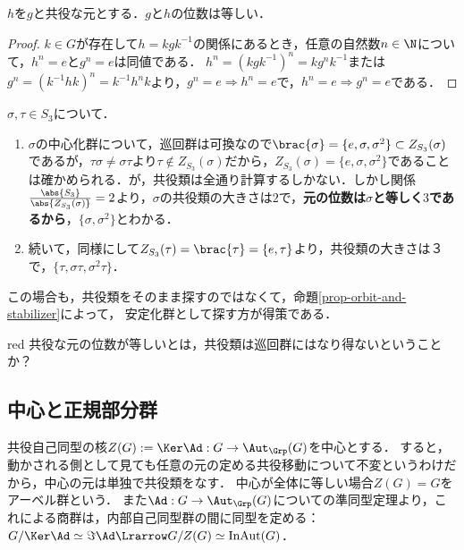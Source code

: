 \documentclass[uplatex,dvipdfmx]{jsreport}
\begin{document}
\begin{lemma}[共役の代数的本質]
    $h$を$g$と共役な元とする．$g$と$h$の位数は等しい．
\end{lemma}
\begin{proof}
    $k\in G$が存在して$h=kgk^{-1}$の関係にあるとき，任意の自然数$n\in\N$について，$h^n=e$と$g^n=e$は同値である．
    $h^n=(kgk^{-1})^n=kg^nk^{-1}$または$g^n=(k^{-1}hk)^n=k^{-1}h^nk$より，$g^n=e\Rightarrow h^n=e$で，$h^n=e\Rightarrow g^n=e$である．
\end{proof}

\begin{example}[$S_3$の類等式]\label{exp-class-equation-of-S3}
    $\sigma,\tau\in S_3$について．
    \begin{enumerate}
        \item $\sigma$の中心化群について，巡回群は可換なので$\brac{\sigma}=\{e,\sigma,\sigma^2\}\subset Z_{S_3}(\sigma)$であるが，$\tau\sigma\ne\sigma\tau$より$\tau\notin Z_{S_3}(\sigma)$だから，$Z_{S_3}(\sigma)=\{e,\sigma,\sigma^2\}$であることは確かめられる．が，共役類は全通り計算するしかない．しかし関係$\frac{\abs{S_3}}{\abs{Z_{S_3}(\sigma)}}=2$より，$\sigma$の共役類の大きさは$2$で，\textbf{元の位数は$\sigma$と等しく$3$であるから}，$\{\sigma,\sigma^2\}$とわかる．
        \item 続いて，同様にして$Z_{S_3}(\tau)=\brac{\tau}=\{e,\tau\}$より，共役類の大きさは３で，$\{\tau,\sigma\tau,\sigma^2\tau\}$．
    \end{enumerate}
    この場合も，共役類をそのまま探すのではなくて，命題\ref{prop-orbit-and-stabilizer}によって，
    安定化群として探す方が得策である．
\end{example}

\begin{tbox}{red}{}
    共役な元の位数が等しいとは，共役類は巡回群にはなり得ないということか？
\end{tbox}

\subsection{中心と正規部分群}

\begin{tcolorbox}[colframe=ForestGreen, colback=ForestGreen!10!white,breakable,colbacktitle=ForestGreen!40!white,coltitle=black,fonttitle=\bfseries\sffamily,
title=]
    共役自己同型の核$Z(G):=\Ker\Ad:G\to\Aut_\Grp(G)$を中心とする．
    すると，動かされる側として見ても任意の元の定める共役移動について不変というわけだから，中心の元は単独で共役類をなす．
    中心が全体に等しい場合$Z(G)=G$をアーベル群という．
    また$\Ad:G\to\Aut_\Grp(G)$についての準同型定理より，これによる商群は，内部自己同型群の間に同型を定める：$G/\Ker\Ad\simeq\Im\Ad\Lrarrow G/Z(G)\simeq\mathrm{InAut}(G)$．
\end{tcolorbox}
\end{document}
